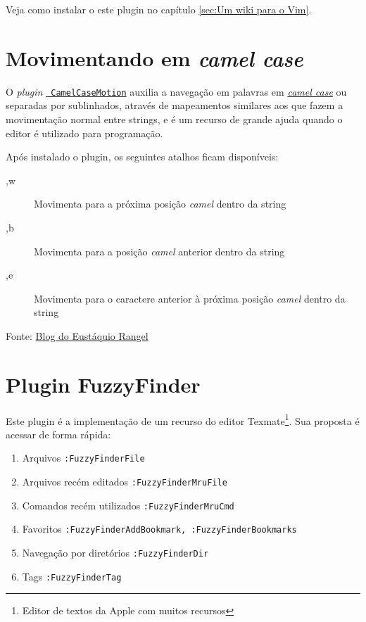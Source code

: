 Veja como instalar o este plugin no capítulo \ref{sec:Um wiki para o Vim}.

\section{Movimentando em {\em camel case}}\label{Movimentando em camel case}
O {\em plugin} \href{http://www.vim.org/scripts/script.php?script\_id=1905}{{\tt
CamelCaseMotion}} auxilia a navegação em palavras em
\href{http://en.wikipedia.org/wiki/Camel\_case}{{\em camel case}} ou separadas
por sublinhados, através de mapeamentos similares aos que fazem a movimentação
normal entre strings, e é um recurso de grande ajuda quando o editor é
utilizado para programação. 

Após instalado o plugin, os seguintes atalhos ficam disponíveis:
\begin{description}
 \item [,w] Movimenta para a próxima posição {\em camel} dentro da string
 \item [,b] Movimenta para a posição {\em camel} anterior dentro da string
 \item [,e] Movimenta para o caractere anterior à próxima posição {\em camel} dentro da string
\end{description}

Fonte: \href{http://eustaquiorangel.com/posts/522}{Blog do Eustáquio Rangel}

\section{Plugin FuzzyFinder}\label{sec:Plugin FuzzyFinder}                                       
Este plugin é a implementação de um recurso do editor 
Texmate\footnote{Editor de textos da Apple com muitos recursos}.
Sua proposta é acessar de forma rápida:

\begin{enumerate}
\item Arquivos \verb|:FuzzyFinderFile|
\item Arquivos recém editados \verb|:FuzzyFinderMruFile|
\item Comandos recém utilizados \verb|:FuzzyFinderMruCmd|
\item Favoritos \verb|:FuzzyFinderAddBookmark, :FuzzyFinderBookmarks|
\item Navegação por diretórios \verb|:FuzzyFinderDir|
\item Tags {\tt :FuzzyFinderTag}
\end{enumerate}

